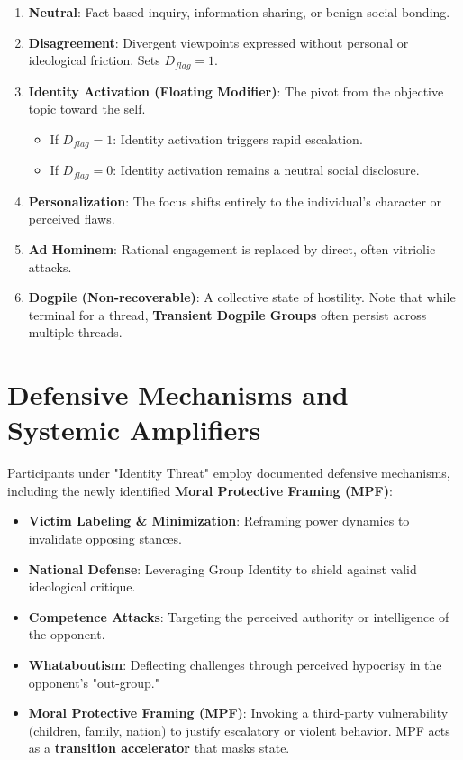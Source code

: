 \documentclass[11pt,a4paper]{article}
\begin{document}
\begin{enumerate}
    \item \textbf{Neutral}: Fact-based inquiry, information sharing, or benign social bonding.
    \item \textbf{Disagreement}: Divergent viewpoints expressed without personal or ideological friction. Sets $D_{flag} = 1$.
    \item \textbf{Identity Activation (Floating Modifier)}: The pivot from the objective topic toward the self. 
    \begin{itemize}
        \item If $D_{flag} = 1$: Identity activation triggers rapid escalation.
        \item If $D_{flag} = 0$: Identity activation remains a neutral social disclosure.
    \end{itemize}
    \item \textbf{Personalization}: The focus shifts entirely to the individual's character or perceived flaws.
    \item \textbf{Ad Hominem}: Rational engagement is replaced by direct, often vitriolic attacks.
    \item \textbf{Dogpile (Non-recoverable)}: A collective state of hostility. Note that while terminal for a thread, \textbf{Transient Dogpile Groups} often persist across multiple threads.
\end{enumerate}

\section{Defensive Mechanisms and Systemic Amplifiers}
Participants under "Identity Threat" employ documented defensive mechanisms, including the newly identified \textbf{Moral Protective Framing (MPF)}:
\begin{itemize}
    \item \textbf{Victim Labeling \& Minimization}: Reframing power dynamics to invalidate opposing stances.
    \item \textbf{National Defense}: Leveraging Group Identity to shield against valid ideological critique.
    \item \textbf{Competence Attacks}: Targeting the perceived authority or intelligence of the opponent.
    \item \textbf{Whataboutism}: Deflecting challenges through perceived hypocrisy in the opponent's "out-group."
    \item \textbf{Moral Protective Framing (MPF)}: Invoking a third-party vulnerability (children, family, nation) to justify escalatory or violent behavior. MPF acts as a \textbf{transition accelerator} that masks state.
\end{itemize}
\end{document}
